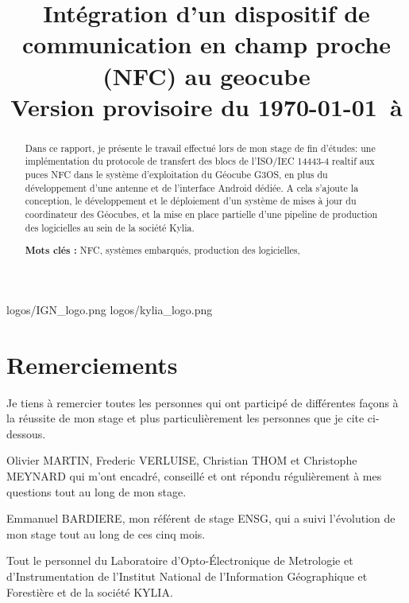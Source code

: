 \documentclass{themeensg}
\title{Intégration d’un dispositif de communication  en champ proche (NFC) au geocube\\Version provisoire du \today~à \timenow}
\begin{document}
\begin{titlepage}
\enterprise 
{logos/IGN_logo.png}
{}
{logos/kylia_logo.png}
{}


\end{titlepage}




\chapter*{Remerciements}

Je tiens à remercier toutes les personnes qui ont participé de différentes façons à la réussite de mon stage et plus particulièrement les personnes que je cite ci-dessous.

Olivier MARTIN, Frederic VERLUISE, Christian THOM et Christophe MEYNARD qui m'ont encadré, conseillé et ont répondu régulièrement à mes questions tout au long de mon stage.

Emmanuel BARDIERE, mon référent de stage ENSG, qui a suivi l'évolution de mon stage tout au long de ces cinq mois.

Tout le personnel du Laboratoire d'Opto-Électronique de Metrologie et d'Instrumentation de l'Institut National de l'Information Géographique et Forestière et de la société KYLIA.


\begin{abstract}
\thispagestyle{empty}
	\vspace{1cm}

	Dans ce rapport, je présente le travail effectué lors de mon stage de fin d'études: une implémentation du protocole de transfert des blocs de l'ISO/IEC 14443-4 realtif aux puces NFC dans le système d'exploitation du Géocube G3OS, en plus du développement d'une antenne et de l'interface Android dédiée. A cela s'ajoute la conception, le développement et le déploiement d'un système de mises à jour du coordinateur des Géocubes, et la mise en place partielle d'une pipeline de production des logicielles au sein de la société Kylia.
	
	\vspace{1.5cm}
	
	\textbf{Mots clés :} NFC, systèmes embarqués, production des logicielles,
\end{abstract}
\end{document}
